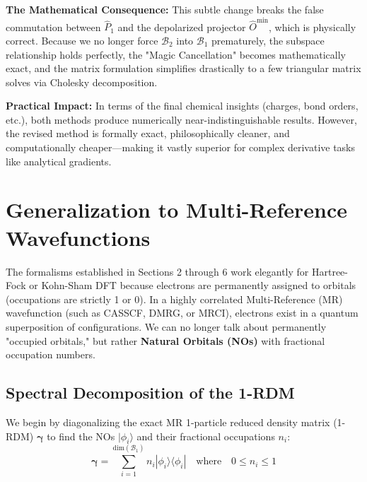 \documentclass[11pt]{article}
\newcommand{\mnote}[1]{\marginpar{\linespread{1.1}\footnotesize\textsf{\textcolor{blue}{\textbf{Margin Note:} #1}}}}
\begin{document}
\textbf{The Mathematical Consequence:} This subtle change breaks the false commutation between $\hat{P}_1$ and the depolarized projector $\hat{O}^{\text{min}}$, which is physically correct. Because we no longer force $\mathcal{B}_2$ into $\mathcal{B}_1$ prematurely, the subspace relationship holds perfectly, the "Magic Cancellation" becomes mathematically exact, and the matrix formulation simplifies drastically to a few triangular matrix solves via Cholesky decomposition.

\textbf{Practical Impact:} In terms of the final chemical insights (charges, bond orders, etc.), both methods produce numerically near-indistinguishable results. However, the revised method is formally exact, philosophically cleaner, and computationally cheaper—making it vastly superior for complex derivative tasks like analytical gradients.

\vspace{0.5cm}

\section{Generalization to Multi-Reference Wavefunctions}

The formalisms established in Sections 2 through 6 work elegantly for Hartree-Fock or Kohn-Sham DFT because electrons are permanently assigned to orbitals (occupations are strictly 1 or 0). In a highly correlated Multi-Reference (MR) wavefunction (such as CASSCF, DMRG, or MRCI), electrons exist in a quantum superposition of configurations. We can no longer talk about permanently "occupied orbitals," but rather \textbf{Natural Orbitals (NOs)} with fractional occupation numbers.

\subsection{Spectral Decomposition of the 1-RDM}

We begin by diagonalizing the exact MR 1-particle reduced density matrix (1-RDM) $\boldsymbol{\gamma}$ to find the NOs $|\phi_i\rangle$ and their fractional occupations $n_i$:
\begin{equation}
    \boldsymbol{\gamma} = \sum_{i=1}^{\text{dim}(\mathcal{B}_1)} n_i |\phi_i\rangle \langle \phi_i| \quad \text{where} \quad 0 \leq n_i \leq 1
\end{equation}

\end{document}
